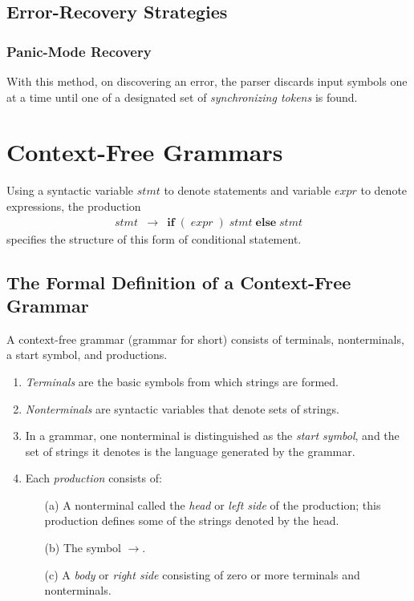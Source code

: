 \documentclass[a4paper,twoside]{book}
\begin{document}
\subsection{Error-Recovery Strategies}
\subsubsection{Panic-Mode Recovery}

With this method, on discovering an error, the parser discards input symbols one at a time until one of a designated set of \textit{synchronizing tokens} is found.

\section{Context-Free Grammars}

Using a syntactic variable $stmt$ to denote statements and variable $expr$ to denote expressions, the production
\begin{equation}
    \begin{array}{ccc}stmt&\rightarrow&\textbf{if}\;(\;expr\;)\;stmt\;\textbf{else}\;stmt\end{array}
    \label{4.4}
\end{equation}
specifies the structure of this form of conditional statement.

\subsection{The Formal Definition of a Context-Free Grammar}

A context-free grammar (grammar for short) consists of terminals, nonterminals, a start symbol, and productions.
\begin{enumerate}
    \item\textit{Terminals} are the basic symbols from which strings are formed.
    \item\textit{Nonterminals} are syntactic variables that denote sets of strings.
    \item In a grammar, one nonterminal is distinguished as the \textit{start symbol}, and the set of strings it denotes is the language generated by the grammar.
    \item Each \textit{production} consists of:
    \begin{itemize}
        \item[(a)] A nonterminal called the \textit{head} or \textit{left side} of the production; this production defines some of the strings denoted by the head.
        \item[(b)] The symbol $\rightarrow$.
        \item[(c)] A \textit{body} or \textit{right side} consisting of zero or more terminals and nonterminals.
    \end{itemize}
\end{enumerate}
\end{document}
